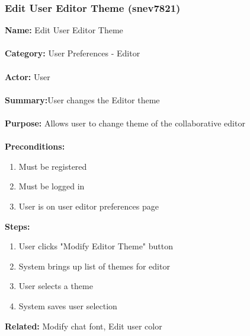 \documentclass[11pt]{report}
\begin{document}
\subsubsection{Edit User Editor Theme (snev7821)}
\begin{framed}
	\noindent\textbf{Name:} Edit User Editor Theme \\ \\
	\textbf{Category:} User Preferences - Editor  \\ \\
	\textbf{Actor:} User \\ \\
	\textbf{Summary:}User changes the Editor theme \\ \\
	\textbf{Purpose:} Allows user to change theme of the collaborative editor \\ \\
	\textbf{Preconditions:} 
	\begin{enumerate}
		\item Must be registered
		\item Must be logged in
		\item User is on user editor preferences page
	\end{enumerate}
	\textbf{Steps:}
	\begin{enumerate}
		\item User clicks "Modify Editor Theme" button
		\item System brings up list of themes for editor
		\item User selects a theme
		\item System saves user selection
	\end{enumerate}
	\textbf{Related:} Modify chat font, Edit user color 
\end{framed}

\newpage
\end{document}

